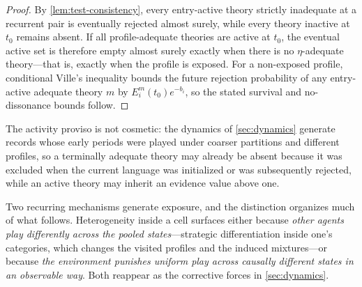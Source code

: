 \documentclass[11pt]{article}
\theoremstyle{definition}
\begin{document}
\begin{proof}
By \cref{lem:test-consistency}, every entry-active theory strictly inadequate at a recurrent pair is eventually rejected almost surely, while every theory inactive at $t_0$ remains absent.
If all profile-adequate theories are active at $t_0$, the eventual active set is therefore empty almost surely exactly when there is no $\eta$-adequate theory---that is, exactly when the profile is exposed.
For a non-exposed profile, conditional Ville's inequality bounds the future rejection probability of any entry-active adequate theory $m$ by $E_i^m(t_0)e^{-b_i}$, so the stated survival and no-dissonance bounds follow.
\end{proof}

The activity proviso is not cosmetic: the dynamics of \cref{sec:dynamics} generate records whose early periods were played under coarser partitions and different profiles, so a terminally adequate theory may already be absent because it was excluded when the current language was initialized or was subsequently rejected, while an active theory may inherit an evidence value above one.

Two recurring mechanisms generate exposure, and the distinction organizes much of what follows.
Heterogeneity inside a cell surfaces either because \emph{other agents play differently across the pooled states}---strategic differentiation inside one's categories, which changes the visited profiles and the induced mixtures---or because \emph{the environment punishes uniform play across causally different states in an observable way}.
Both reappear as the corrective forces in \cref{sec:dynamics}.
\end{document}
